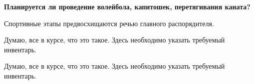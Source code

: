 \documentclass[a4paper, 12pt]{extarticle}
\begin{document}
\setcounter{tocdepth}{3}







\tableofcontents













%




\par \textbf{Планируется ли проведение волейбола, капитошек, перетягивания каната?}
\par Спортивные этапы предвосхищаются речью главного распорядителя.




Думаю, все в курсе, что это такое. Здесь необходимо указать требуемый инвентарь.




Думаю, все в курсе, что это такое. Здесь необходимо указать требуемый инвентарь.



\end{document}
